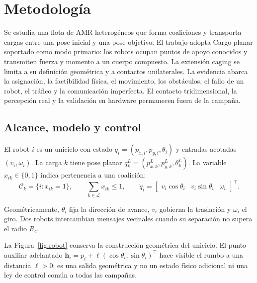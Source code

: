 \section{Metodología}
\label{sec:methodology}

Se estudia una flota de AMR heterogéneos que forma coaliciones y transporta
cargas entre una pose inicial y una pose objetivo. El trabajo adopta Cargo planar
soportado como modo primario: los robots ocupan puntos de apoyo conocidos y
transmiten fuerza y momento a un cuerpo compuesto. La extensión caging se limita
a su definición geométrica y a contactos unilaterales. La evidencia abarca la
asignación, la factibilidad física, el movimiento, los obstáculos, el fallo de un
robot, el tráfico y la comunicación imperfecta. El contacto tridimensional, la
percepción real y la validación en hardware permanecen fuera de la campaña.

\subsection{Alcance, modelo y control}
\label{sec:method_model_scope}

El robot \(i\) es un uniciclo con estado
\(q_i=(p_{x,i},p_{y,i},\theta_i)\) y entradas acotadas
\((v_i,\omega_i)\). La carga \(k\) tiene pose planar
\(q_k^L=(p_{x,k}^L,p_{y,k}^L,\theta_k^L)\). La variable
\(x_{ik}\in\{0,1\}\) indica pertenencia a una coalición:
\begin{equation}
    \mathcal C_k=\{i:x_{ik}=1\},\qquad
    \sum_{k\in\mathcal L}x_{ik}\leq1,\qquad
    \dot q_i=
    \begin{bmatrix}
        v_i\cos\theta_i & v_i\sin\theta_i & \omega_i
    \end{bmatrix}^{\!\top}.
    \label{eq:method_common_model}
\end{equation}

Geométricamente, \(\theta_i\) fija la dirección de avance, \(v_i\) gobierna la
traslación y \(\omega_i\) el giro. Dos robots intercambian mensajes vecinales
cuando su separación no supera el radio \(R_c\).

La Figura~\ref{fig:robot} conserva la construcción geométrica del uniciclo. El
punto auxiliar adelantado
\(\boldsymbol h_i=p_i+\ell(\cos\theta_i,\sin\theta_i)^\top\) hace visible el
rumbo a una distancia \(\ell>0\); es una salida geométrica y no un estado físico
adicional ni una ley de control común a todas las campañas.



